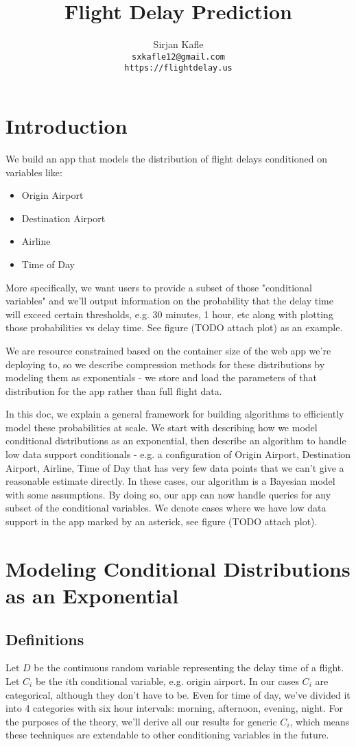 \documentclass{article}
\title{Flight Delay Prediction}
\author{%
  Sirjan Kafle \\
  \texttt{sxkafle12@gmail.com} \\
  \texttt{https://flightdelay.us}
}
\begin{document}
\maketitle

\section{Introduction}
We build an app that models the distribution of flight delays conditioned on variables like:
\begin{itemize}
  \item Origin Airport
  \item Destination Airport
  \item Airline
  \item Time of Day
\end{itemize}

More specifically, we want users to provide a subset of those "conditional variables" and we'll output information on the probability that the delay
time will exceed certain thresholds, e.g. 30 minutes, 1 hour, etc along with plotting those probabilities vs delay time. See figure (TODO attach plot)
as an example.

We are resource constrained based on the container size of the web app we're deploying to, so we describe compression methods for these distributions by modeling them as exponentials - we store
and load the parameters of that distribution for the app rather than full flight data.

In this doc, we explain a general framework for building algorithms to efficiently model these probabilities at scale. We start with describing
how we model conditional distributions as an exponential, then describe an algorithm to handle low data support conditionals - e.g. a configuration
of Origin Airport, Destination Airport, Airline, Time of Day that has very few data points that we can't give a reasonable estimate directly. In 
these cases, our algorithm is a Bayesian model with some assumptions. By doing so, our app can now handle queries for any subset of the conditional
variables. We denote cases where we have low data support in the app marked by an asterick, see figure (TODO attach plot).

\section{Modeling Conditional Distributions as an Exponential}
\subsection{Definitions}
Let $D$ be the continuous random variable representing the delay time of a flight. Let $C_i$ be the $i$th conditional variable, e.g. origin airport.
In our cases $C_i$ are categorical, although they don't have to be. Even for time of day, we've divided it into 4 categories with six hour intervals: morning, afternoon, evening, night.
For the purposes of the theory, we'll derive all our results for generic $C_i$, which means these techniques are extendable to other conditioning variables
in the future.
\end{document}
